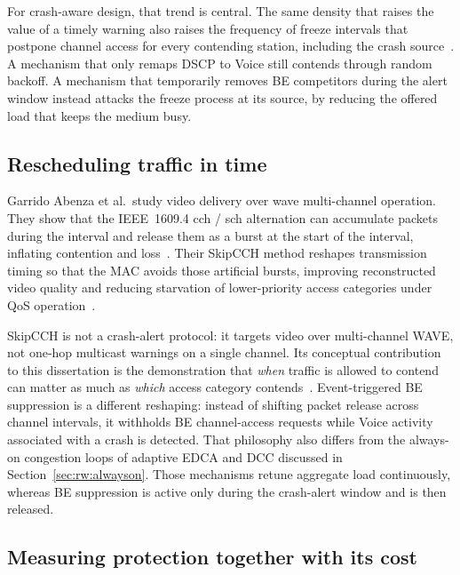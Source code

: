 For crash-aware design, that trend is central.
The same density that raises the value of a timely warning also raises the frequency of freeze intervals that postpone channel access for every contending station, including the crash source~\cite{Continuous_Backoff_Freezing_Li,bianchi2000DCF}.
A mechanism that only remaps DSCP to Voice still contends through random backoff.
A mechanism that temporarily removes BE competitors during the alert window instead attacks the freeze process at its source, by reducing the offered load that keeps the medium busy.

\subsection{Rescheduling traffic in time}
\label{sec:rw:skipcch}

Garrido Abenza et al.\ study video delivery over \gls{wave} multi-channel operation.
They show that the IEEE~1609.4 \gls{cch} / \gls{sch} alternation can accumulate packets during the  interval and release them as a burst at the start of the  interval, inflating contention and loss~\cite{SkipCCH_Garrido,ieee1609_4}.
Their SkipCCH method reshapes transmission timing so that the MAC avoids those artificial bursts, improving reconstructed video quality and reducing starvation of lower-priority access categories under QoS operation~\cite{SkipCCH_Garrido}.

SkipCCH is not a crash-alert protocol: it targets video over multi-channel WAVE, not one-hop multicast warnings on a single channel.
Its conceptual contribution to this dissertation is the demonstration that \emph{when} traffic is allowed to contend can matter as much as \emph{which} access category contends~\cite{SkipCCH_Garrido}.
Event-triggered BE suppression is a different reshaping: instead of shifting packet release across channel intervals, it withholds BE channel-access requests while Voice activity associated with a crash is detected.
That philosophy also differs from the always-on congestion loops of adaptive EDCA and DCC discussed in Section~\ref{sec:rw:alwayson}.
Those mechanisms retune aggregate load continuously, whereas BE suppression is active only during the crash-alert window and is then released.

\subsection{Measuring protection together with its cost}
\label{sec:rw:cost}


